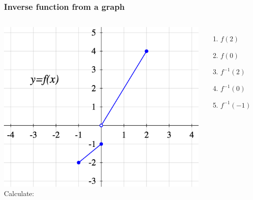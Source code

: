 \documentclass[14pt]{beamer}
\begin{document}
\begin{frame}
	\frametitle{Inverse function from a graph}

	\begin{columns}[c]
		\includegraphics[scale=.4]{G12}
		Calculate:
		\begin{enumerate}
			\item $\displaystyle f(2)$

			\item $\displaystyle f(0)$

			\item $\displaystyle f^{-1}(2)$

			\item $\displaystyle f^{-1}(0)$

			\item $\displaystyle f^{-1}(-1)$
		\end{enumerate}
	\end{columns}
\end{frame}
\end{document}
